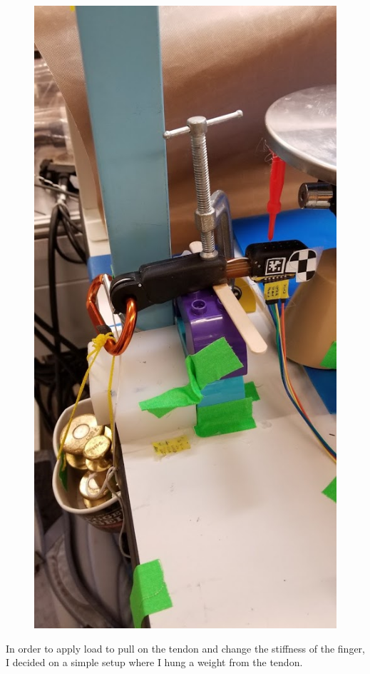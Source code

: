 \documentclass[12pt]{article}
\begin{document}
\begin{figure}[H]
\centering
\includegraphics[width=.3\textheight]{images/setup/leveling.jpg}
\end{figure}

In order to apply load to pull on the tendon and change the stiffness of the finger, I decided on a
simple setup where I hung a weight from the tendon.
\end{document}
